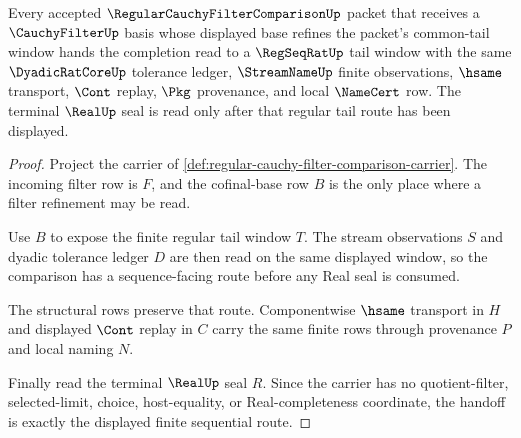 \begin{theorem}
\label{thm:regular-cauchy-filter-comparison-sequential-handoff}
Every accepted $\RegularCauchyFilterComparisonUp$ packet that receives a $\CauchyFilterUp$ basis whose displayed base refines the packet's common-tail window hands the completion read to a $\RegSeqRatUp$ tail window with the same $\DyadicRatCoreUp$ tolerance ledger, $\StreamNameUp$ finite observations, $\hsame$ transport, $\Cont$ replay, $\Pkg$ provenance, and local $\NameCert$ row. The terminal $\RealUp$ seal is read only after that regular tail route has been displayed.
\end{theorem}
\begin{proof}
Project the carrier of \autoref{def:regular-cauchy-filter-comparison-carrier}. The incoming filter row is $F$, and the cofinal-base row $B$ is the only place where a filter refinement may be read.

Use $B$ to expose the finite regular tail window $T$. The stream observations $S$ and dyadic tolerance ledger $D$ are then read on the same displayed window, so the comparison has a sequence-facing route before any Real seal is consumed.

The structural rows preserve that route. Componentwise $\hsame$ transport in $H$ and displayed $\Cont$ replay in $C$ carry the same finite rows through provenance $P$ and local naming $N$.

Finally read the terminal $\RealUp$ seal $R$. Since the carrier has no quotient-filter, selected-limit, choice, host-equality, or Real-completeness coordinate, the handoff is exactly the displayed finite sequential route.
\end{proof}

